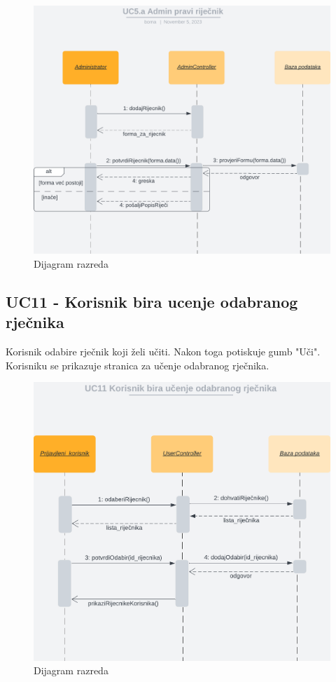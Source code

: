 				\begin{figure}[H]
					\includegraphics[scale=0.5]{dijagrami/UC5.png} 
					\centering
					\caption{Dijagram razreda}
					\label{fig:class_diagram}
				\end{figure}	
				\eject

				\subsection*{UC11 - Korisnik bira ucenje odabranog rječnika}

				Korisnik odabire rječnik koji želi učiti. Nakon toga potiskuje gumb "Uči". Korisniku se prikazuje stranica za učenje odabranog rječnika.\\
				\begin{figure}[H]
					\includegraphics[scale=0.5]{dijagrami/UC11.png} 
					\centering
					\caption{Dijagram razreda}
					\label{fig:class_diagram}
				\end{figure}	
				\eject

